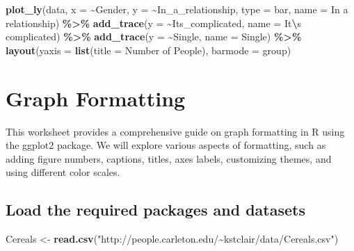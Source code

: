 \documentclass[
]{book}
\newenvironment{Shaded}{\begin{snugshade}}{\end{snugshade}}
\newcommand{\AttributeTok}[1]{\textcolor[rgb]{0.13,0.29,0.53}{#1}}
\newcommand{\FunctionTok}[1]{\textcolor[rgb]{0.13,0.29,0.53}{\textbf{#1}}}
\newcommand{\NormalTok}[1]{#1}
\newcommand{\OtherTok}[1]{\textcolor[rgb]{0.56,0.35,0.01}{#1}}
\newcommand{\SpecialCharTok}[1]{\textcolor[rgb]{0.81,0.36,0.00}{\textbf{#1}}}
\newcommand{\StringTok}[1]{\textcolor[rgb]{0.31,0.60,0.02}{#1}}
\begin{document}
\begin{Shaded}
\begin{Highlighting}[]
\FunctionTok{plot\_ly}\NormalTok{(data, }\AttributeTok{x =} \SpecialCharTok{\textasciitilde{}}\NormalTok{Gender, }\AttributeTok{y =} \SpecialCharTok{\textasciitilde{}}\NormalTok{In\_a\_relationship, }\AttributeTok{type =} \StringTok{\textquotesingle{}bar\textquotesingle{}}\NormalTok{, }\AttributeTok{name =} \StringTok{\textquotesingle{}In a relationship\textquotesingle{}}\NormalTok{) }\SpecialCharTok{\%\textgreater{}\%}
  \FunctionTok{add\_trace}\NormalTok{(}\AttributeTok{y =} \SpecialCharTok{\textasciitilde{}}\NormalTok{Its\_complicated, }\AttributeTok{name =} \StringTok{\textquotesingle{}It}\SpecialCharTok{\textbackslash{}\textquotesingle{}}\StringTok{s complicated\textquotesingle{}}\NormalTok{) }\SpecialCharTok{\%\textgreater{}\%}
  \FunctionTok{add\_trace}\NormalTok{(}\AttributeTok{y =} \SpecialCharTok{\textasciitilde{}}\NormalTok{Single, }\AttributeTok{name =} \StringTok{\textquotesingle{}Single\textquotesingle{}}\NormalTok{) }\SpecialCharTok{\%\textgreater{}\%}
  \FunctionTok{layout}\NormalTok{(}\AttributeTok{yaxis =} \FunctionTok{list}\NormalTok{(}\AttributeTok{title =} \StringTok{\textquotesingle{}Number of People\textquotesingle{}}\NormalTok{), }\AttributeTok{barmode =} \StringTok{\textquotesingle{}group\textquotesingle{}}\NormalTok{)}
\end{Highlighting}
\end{Shaded}

\hypertarget{graph-formatting}{%
\chapter{Graph Formatting}\label{graph-formatting}}

This worksheet provides a comprehensive guide on graph formatting in R using the ggplot2 package. We will explore various aspects of formatting, such as adding figure numbers, captions, titles, axes labels, customizing themes, and using different color scales.

\hypertarget{load-the-required-packages-and-datasets}{%
\section{Load the required packages and datasets}\label{load-the-required-packages-and-datasets}}

\begin{Shaded}
\begin{Highlighting}[]
\NormalTok{Cereals }\OtherTok{\textless{}{-}} \FunctionTok{read.csv}\NormalTok{(}\StringTok{"http://people.carleton.edu/\textasciitilde{}kstclair/data/Cereals.csv"}\NormalTok{)}
\end{Highlighting}
\end{Shaded}
\end{document}
